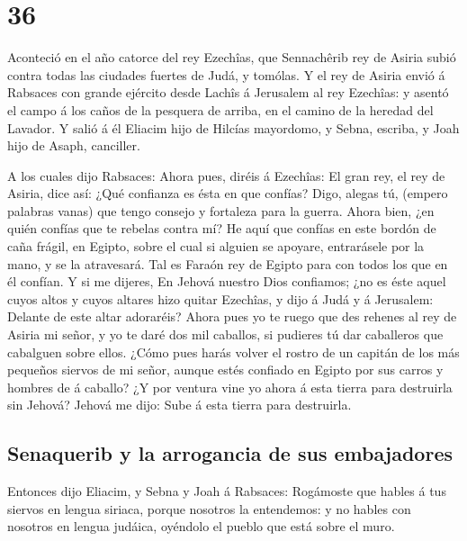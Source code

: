 \hypertarget{section-23-36}{%
\section{36}\label{section-23-36}}

 Aconteció en el año catorce del rey Ezechîas, que
Sennachêrib rey de Asiria subió contra todas las ciudades fuertes de
Judá, y tomólas.  Y el rey de Asiria envió á Rabsaces con
grande ejército desde Lachîs á Jerusalem al rey Ezechîas: y asentó el
campo á los caños de la pesquera de arriba, en el camino de la heredad
del Lavador.  Y salió á él Eliacim hijo de Hilcías
mayordomo, y Sebna, escriba, y Joah hijo de Asaph, canciller.

 A los cuales dijo Rabsaces: Ahora pues, diréis á
Ezechîas: El gran rey, el rey de Asiria, dice así: ¿Qué confianza es
ésta en que confías?  Digo, alegas tú, (empero palabras
vanas) que tengo consejo y fortaleza para la guerra. Ahora bien, ¿en
quién confías que te rebelas contra mí?  He aquí que
confías en este bordón de caña frágil, en Egipto, sobre el cual si
alguien se apoyare, entrarásele por la mano, y se la atravesará. Tal es
Faraón rey de Egipto para con todos los que en él confían.
 Y si me dijeres, En Jehová nuestro Dios confiamos; ¿no es
éste aquel cuyos altos y cuyos altares hizo quitar Ezechîas, y dijo á
Judá y á Jerusalem: Delante de este altar adoraréis? 
Ahora pues yo te ruego que des rehenes al rey de Asiria mi señor, y yo
te daré dos mil caballos, si pudieres tú dar caballeros que cabalguen
sobre ellos.  ¿Cómo pues harás volver el rostro de un
capitán de los más pequeños siervos de mi señor, aunque estés confiado
en Egipto por sus carros y hombres de á caballo?  ¿Y por
ventura vine yo ahora á esta tierra para destruirla sin Jehová? Jehová
me dijo: Sube á esta tierra para destruirla.

\hypertarget{senaquerib-y-la-arrogancia-de-sus-embajadores}{%
\subsection{Senaquerib y la arrogancia de sus
embajadores}\label{senaquerib-y-la-arrogancia-de-sus-embajadores}}

 Entonces dijo Eliacim, y Sebna y Joah á Rabsaces:
Rogámoste que hables á tus siervos en lengua siriaca, porque nosotros la
entendemos: y no hables con nosotros en lengua judáica, oyéndolo el
pueblo que está sobre el muro.

